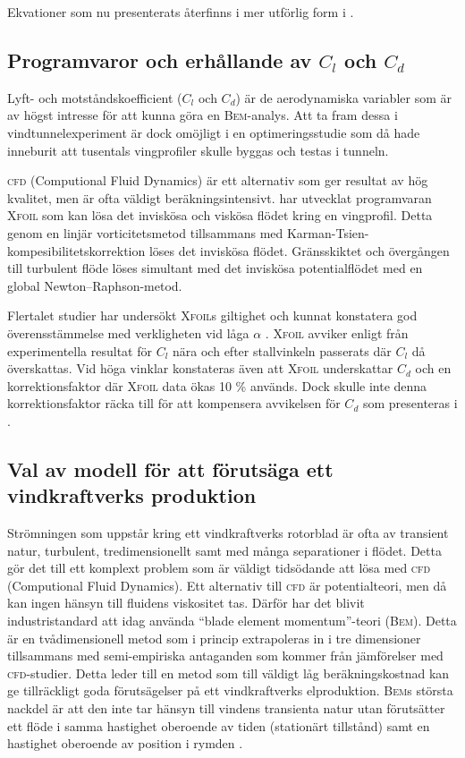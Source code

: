 Ekvationer som nu presenterats återfinns i mer utförlig form i \citet{smallwindturbines}. 



\subsection{Programvaror och erhållande av $C_l$ och $C_d$}
Lyft- och motståndskoefficient ($C_l$ och $C_d$) är de aerodynamiska variabler som är av högst intresse för att kunna göra en \textsc{Bem}-analys. Att ta fram dessa i vindtunnelexperiment är dock omöjligt i en optimeringsstudie som då hade inneburit att tusentals vingprofiler skulle byggas och testas i tunneln.

\textsc{cfd} (Computional Fluid Dynamics) är ett alternativ som ger resultat av hög kvalitet, men är ofta väldigt beräkningsintensivt. \cite{Xfoil} har utvecklat programvaran \textsc{Xfoil} som kan lösa det inviskösa och viskösa flödet kring en vingprofil. Detta genom en linjär vorticitetsmetod tillsammans med Karman-Tsien-kompesibilitetskorrektion löses det inviskösa flödet. Gränsskiktet och övergången till turbulent flöde löses simultant med det inviskösa potentialflödet med en global Newton–Raphson-metod.

Flertalet studier har undersökt \textsc{Xfoil}s giltighet och kunnat konstatera god överensstämmelse med verkligheten vid låga $\alpha$ \citep{CST, XfoilVerifikation}. \textsc{Xfoil} avviker enligt \citet{XfoilVerifikation} från experimentella resultat för $C_l$ nära och efter stallvinkeln passerats där $C_l$ då överskattas. Vid höga vinklar konstateras även att \textsc{Xfoil} underskattar $C_d$ och en korrektionsfaktor där \textsc{Xfoil} data ökas 10 \% används. Dock skulle inte denna korrektionsfaktor räcka till för att kompensera avvikelsen för $C_d$ som presenteras i \citet{CST}.


\subsection{Val av modell för att förutsäga ett vindkraftverks produktion}

Strömningen som uppstår kring ett vindkraftverks rotorblad är ofta av transient natur, turbulent, tredimensionellt samt med många separationer i flödet. Detta gör det till ett komplext problem som är väldigt tidsödande att lösa med \textsc{cfd} (Computional Fluid Dynamics). Ett alternativ till \textsc{cfd} är potentialteori, men då kan ingen hänsyn till fluidens viskositet tas. Därför har det blivit industristandard att idag använda ``blade element momentum''-teori (\textsc{Bem}). Detta är en tvådimensionell metod som i princip extrapoleras in i tre dimensioner tillsammans med semi-empiriska antaganden som kommer från jämförelser med \textsc{cfd}-studier. Detta leder till en metod som till väldigt låg beräkningskostnad kan ge tillräckligt goda förutsägelser på ett vindkraftverks elproduktion. \textsc{Bem}s största nackdel är att den inte tar hänsyn till vindens transienta natur utan förutsätter ett flöde i samma hastighet oberoende av tiden (stationärt tillstånd) samt en hastighet oberoende av position i rymden \citep{Qblade}. 


